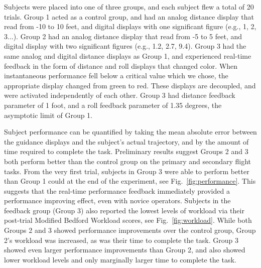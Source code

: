 \documentclass[]{aiaa-tc}%
\begin{document}
Subjects were placed into one of three groups, and each subject flew a total of 20 trials. Group 1 acted as a control group, and had an analog distance display that read from -10 to 10 feet, and digital displays with one significant figure (e.g., 1, 2, 3...). Group 2 had an analog distance display that read from -5 to 5 feet, and digital display with two significant figures (e.g., 1.2, 2.7, 9.4). Group 3 had the same analog and digital distance displays as Group 1, and experienced real-time feedback in the form of distance and roll displays that changed color. When instantaneous performance fell below a critical value which we chose, the appropriate display changed from green to red. These displays are decoupled, and were activated independently of each other. Group 3 had distance feedback parameter of 1 foot, and a roll feedback parameter of 1.35 degrees, the asymptotic limit of Group 1.


Subject performance can be quantified by taking the mean absolute error between the guidance displays and the subject's actual trajectory, and by the amount of time required to complete the task. Preliminary results suggest Groups 2 and 3 both perform better than the control group on the primary and secondary flight tasks. From the very first trial, subjects in Group 3 were able to perform better than Group 1 could at the end of the experiment, see Fig.~\ref{fig:performance}. This suggests that the real-time performance feedback immediately provided a performance improving effect, even with novice operators. Subjects in the feedback group (Group 3) also reported the lowest levels of workload via their post-trial Modified Bedford Workload scores, see Fig.~\ref{fig:workload}. While both Groups 2 and 3 showed performance improvements over the control group, Group 2's workload was increased, as was their time to complete the task. Group 3 showed even larger performance improvements than Group 2, and also showed lower workload levels and only marginally larger time to complete the task.
\end{document}
